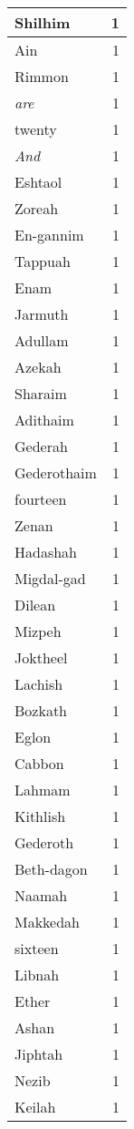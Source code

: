 \begin{center}
\begin{longtable}{l|r}
Shilhim & 1\\ \hline 
Ain & 1\\ \hline 
Rimmon & 1\\ \hline 
\emph{are} & 1\\ \hline 
twenty & 1\\ \hline 
\emph{And} & 1\\ \hline 
Eshtaol & 1\\ \hline 
Zoreah & 1\\ \hline 
En-gannim & 1\\ \hline 
Tappuah & 1\\ \hline 
Enam & 1\\ \hline 
Jarmuth & 1\\ \hline 
Adullam & 1\\ \hline 
Azekah & 1\\ \hline 
Sharaim & 1\\ \hline 
Adithaim & 1\\ \hline 
Gederah & 1\\ \hline 
Gederothaim & 1\\ \hline 
fourteen & 1\\ \hline 
Zenan & 1\\ \hline 
Hadashah & 1\\ \hline 
Migdal-gad & 1\\ \hline 
Dilean & 1\\ \hline 
Mizpeh & 1\\ \hline 
Joktheel & 1\\ \hline 
Lachish & 1\\ \hline 
Bozkath & 1\\ \hline 
Eglon & 1\\ \hline 
Cabbon & 1\\ \hline 
Lahmam & 1\\ \hline 
Kithlish & 1\\ \hline 
Gederoth & 1\\ \hline 
Beth-dagon & 1\\ \hline 
Naamah & 1\\ \hline 
Makkedah & 1\\ \hline 
sixteen & 1\\ \hline 
Libnah & 1\\ \hline 
Ether & 1\\ \hline 
Ashan & 1\\ \hline 
Jiphtah & 1\\ \hline 
Nezib & 1\\ \hline 
Keilah & 1\\ \hline 

\end{longtable}
\end{center}
